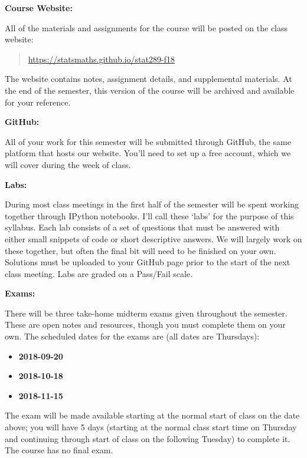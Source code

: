 \documentclass[12pt]{article}
\begin{document}
\textbf{Course Website:} \vspace{6pt}

All of the materials and assignments for the course will be posted
on the class website:
\begin{quote}
\url{https://statsmaths.github.io/stat289-f18}
\end{quote}
The website contains notes, assignment details, and
supplemental materials. At the end of the semester, this version of
the course will be archived and available for your reference.

\bigskip

\textbf{GitHub:} \vspace{6pt}

All of your work for this semester will be submitted through GitHub,
the same platform that hosts our website. You'll need to set up a free
account, which we will cover during the week of class.

\bigskip

\textbf{Labs:} \vspace{6pt}

During most class meetings in the first half of the semester will be spent
working together through IPython notebooks. I'll call these `labs' for the 
purpose of this syllabus. Each lab consists of a set of questions that must be
answered with either small snippets of code or short descriptive answers. We
will largely work on these together, but often the final bit will need to be
finished on your own. Solutions must be uploaded to your GitHub page prior to
the start of the next class meeting. Labs are graded on a Pass/Fail scale.

\clearpage

\textbf{Exams:} \vspace{6pt}

There will be three take-home midterm exams given throughout the semester.
These are open notes and resources, though you must complete them on your
own. The scheduled dates for the exams are (all dates are Thursdays):
\begin{itemize}\setlength\itemsep{0em}
\item \textbf{2018-09-20}
\item \textbf{2018-10-18}
\item \textbf{2018-11-15}
\end{itemize}
The exam will be made available starting at the normal start of class on the
date above; you will have 5 days (starting at the normal class start time on
Thursday and continuing through start of class on the following Tuesday) to
complete it. The course has no final exam.
\end{document}
